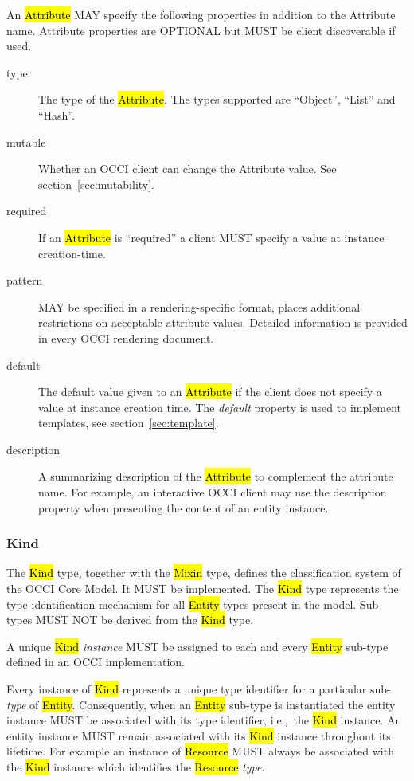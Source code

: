 \documentclass[10pt,a4paper]{article}
\begin{document}
An \hl{Attribute} MAY specify the following properties in addition to the
Attribute name. Attribute properties are OPTIONAL but MUST be client
discoverable if used.
\begin{description}
\item[type] The type of the \hl{Attribute}. The types supported are ``Object'', ``List'' and ``Hash''.

\item[mutable] Whether an OCCI client can change the Attribute value. See
  section~\ref{sec:mutability}.

\item[required] If an \hl{Attribute} is ``required'' a client MUST specify a
  value at instance creation-time.

\item[pattern] MAY be specified in a rendering-specific format, places additional restrictions on acceptable attribute values. Detailed
  information is provided in every OCCI rendering document.

\item[default] The default value given to an \hl{Attribute} if the client does
  not specify a value at instance creation time.  The {\em default} property is used to implement templates, see section~\ref{sec:template}.

\item[description] A summarizing description of the \hl{Attribute} to
  complement the attribute name. For example, an interactive OCCI client may
  use the description property when presenting the content of an entity
  instance.
\end{description}


\subsubsection{Kind}
\label{sec:kind}

The \hl{Kind} type, together with the \hl{Mixin} type, defines the
classification system of the OCCI Core Model. It MUST be
implemented. The \hl{Kind} type represents the type identification
mechanism for all \hl{Entity} types present in the model.
%
Sub-types MUST NOT be derived from the \hl{Kind} type.

A unique \hl{Kind} {\em instance} MUST be assigned to each and every
\hl{Entity} sub-type defined in an OCCI implementation.

Every instance of \hl{Kind} represents a unique type identifier for a
particular sub-{\em type} of \hl{Entity}.  Consequently, when an \hl{Entity}
sub-type is instantiated the entity instance MUST be associated with
its type identifier, i.e.,~the \hl{Kind} instance.  An entity instance
MUST remain associated with its \hl{Kind} instance throughout its
lifetime.
%
For example an instance of \hl{Resource} MUST always be associated
with the \hl{Kind} instance which identifies the \hl{Resource} {\em type}.
\end{document}
